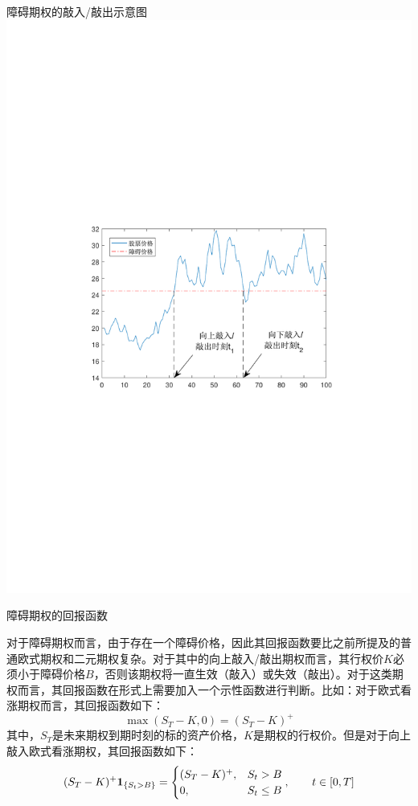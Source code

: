 \documentclass[t]{beamer}
\begin{document}
\begin{frame}{障碍期权的敲入/敲出示意图}
	\centering
\includegraphics[scale=.8]{fig/barrier2.PDF}
\end{frame}


\begin{frame}{障碍期权的回报函数}\small
	\begin{spacing}{1.3}
	对于障碍期权而言，由于存在一个障碍价格，因此其回报函数要比之前所提及的普通欧式期权和二元期权复杂。对于其中的向上敲入/敲出期权而言，其行权价$K$必须小于障碍价格$B$，否则该期权将一直生效（敲入）或失效（敲出）。对于这类期权而言，其回报函数在形式上需要加入一个示性函数进行判断。比如：对于欧式看涨期权而言，其回报函数如下：
\[\max(S_T-K, 0)=(S_T-K)^+ \]
其中，$S_T$是未来期权到期时刻的标的资产价格，$K$是期权的行权价。但是对于向上敲入欧式看涨期权，其回报函数如下：
\[(S_T-K)^+{\bf 1}_{\{S_t>B\}}=\begin{cases}
(S_T-K)^+,  & S_t>B \\
0, &  S_t\le B
\end{cases},\qquad t\in[0,T] \]
\end{spacing}

\end{frame}
\end{document}
